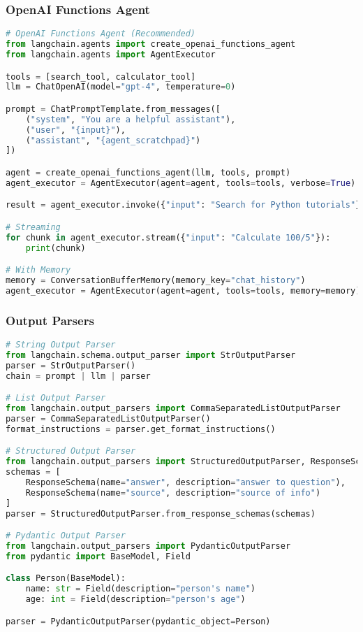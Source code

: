 \begin{frame}[fragile]\frametitle{OpenAI Functions Agent}
\begin{lstlisting}[language=python,basicstyle=\tiny]
# OpenAI Functions Agent (Recommended)
from langchain.agents import create_openai_functions_agent
from langchain.agents import AgentExecutor

tools = [search_tool, calculator_tool]
llm = ChatOpenAI(model="gpt-4", temperature=0)

prompt = ChatPromptTemplate.from_messages([
    ("system", "You are a helpful assistant"),
    ("user", "{input}"),
    ("assistant", "{agent_scratchpad}")
])

agent = create_openai_functions_agent(llm, tools, prompt)
agent_executor = AgentExecutor(agent=agent, tools=tools, verbose=True)

result = agent_executor.invoke({"input": "Search for Python tutorials"})

# Streaming
for chunk in agent_executor.stream({"input": "Calculate 100/5"}):
    print(chunk)

# With Memory
memory = ConversationBufferMemory(memory_key="chat_history")
agent_executor = AgentExecutor(agent=agent, tools=tools, memory=memory)
\end{lstlisting}
\end{frame}

\begin{frame}[fragile]\frametitle{Output Parsers}
\begin{lstlisting}[language=python,basicstyle=\tiny]
# String Output Parser
from langchain.schema.output_parser import StrOutputParser
parser = StrOutputParser()
chain = prompt | llm | parser

# List Output Parser
from langchain.output_parsers import CommaSeparatedListOutputParser
parser = CommaSeparatedListOutputParser()
format_instructions = parser.get_format_instructions()

# Structured Output Parser
from langchain.output_parsers import StructuredOutputParser, ResponseSchema
schemas = [
    ResponseSchema(name="answer", description="answer to question"),
    ResponseSchema(name="source", description="source of info")
]
parser = StructuredOutputParser.from_response_schemas(schemas)

# Pydantic Output Parser
from langchain.output_parsers import PydanticOutputParser
from pydantic import BaseModel, Field

class Person(BaseModel):
    name: str = Field(description="person's name")
    age: int = Field(description="person's age")

parser = PydanticOutputParser(pydantic_object=Person)
\end{lstlisting}
\end{frame}

